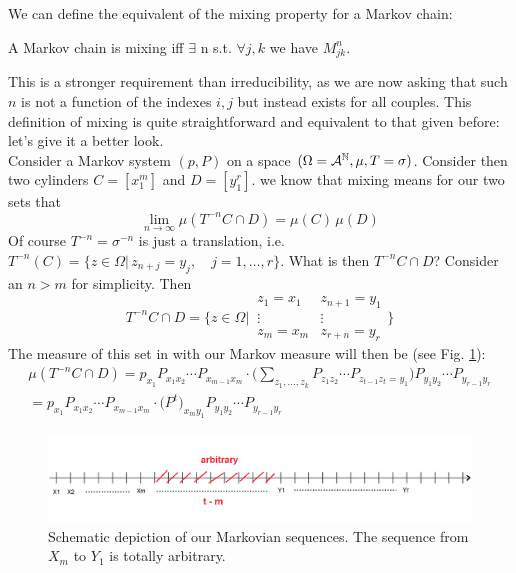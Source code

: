 We can define the equivalent of the mixing property for a Markov chain:
\begin{definition}
    A Markov chain is mixing iff $\exists$ n s.t. $\forall j,k$ we have $M_{jk}^n$.
\end{definition}
This is a stronger requirement than irreducibility, as we are now asking that such $n$ is not a function of the indexes $i,j$ but instead exists for all couples. This definition of mixing is quite straightforward and equivalent to that given before: let's give it a better look. 
\\Consider a Markov system $(p, P)$ on a space $(\Omega=\mathcal{A}^{\mathbb{N}}, \mu, T = \sigma)$. Consider then two cylinders $C= [x_1^m]$ and $D= [y_1^r]$. we know that mixing means for our two sets that 
\begin{equation*}
    \lim_{n \rightarrow \infty} \mu (T^{-n}C \cap D) = \mu(C) \, \mu(D)
\end{equation*}
Of course $T^{-n} = \sigma^{-n}$ is just a translation, i.e. $T^{-n}(C) = \big\{ z \in \Omega | \, z_{n+j} = y_j, \quad j=1, \dots, r \big\}$. What is then $T^{-n}C \cap D$? Consider an $n > m$ for simplicity. Then
\begin{equation*}
    T^{-n}C \cap D = \bigg\{ z \in \Omega \bigg| \, 
    \begin{matrix}
        z_1 = x_1 & z_{n+1} = y_1 \\
        \vdots & \vdots\\
        z_m=x_m  & z_{r+n} = y_r
    \end{matrix}
    \bigg\}
\end{equation*}
The measure of this set in with our Markov measure will then be (see Fig. \ref{fig:markov_line}):
\begin{align}
    \mu(T^{-n}C \cap D) = p_{x_1} P_{x_1 x_2} \cdots P_{x_{m-1} x_m} \cdot \bigg( \sum_{z_1, \dots, z_k} P_{z_1 z_2} \cdots P_{z_{t-1} z_t = y_1} \bigg) P_{y_1 y_2} \cdots P_{y_{r-1} y_r} \nonumber \\
    =  p_{x_1} P_{x_1 x_2} \cdots P_{x_{m-1} x_m} \cdot \big( P^t\big)_{x_m y_1} P_{y_1 y_2} \cdots P_{y_{r-1} y_r}
\end{align}
\begin{figure}[h]
    \centering\includegraphics[width=12cm]{img/markov_line.png}
    \caption{Schematic depiction of our Markovian sequences. The sequence from $X_m$ to $Y_1$ is totally arbitrary.}
    \label{fig:markov_line}
\end{figure}
